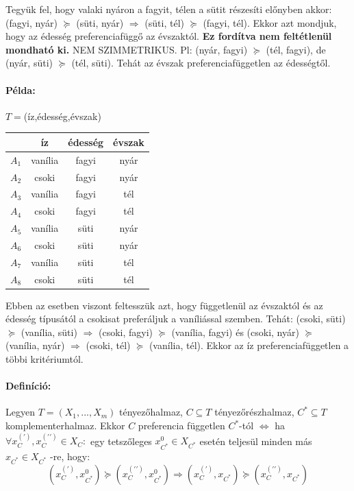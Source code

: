\documentclass[a4paper,12pt]{article}
\begin{document}
Tegyük fel, hogy valaki nyáron a fagyit, télen a sütit részesíti előnyben akkor: (fagyi, nyár) $\succeq$ (süti, nyár) 
$\Rightarrow$
(süti, tél) $\succeq$ (fagyi, tél). Ekkor azt mondjuk, hogy az édesség preferenciafüggő az évszaktól. \textbf{Ez fordítva nem feltétlenül mondható ki.} NEM SZIMMETRIKUS. Pl: (nyár, fagyi) $\succeq$ (tél, fagyi), de (nyár, süti) $\succeq$ (tél, süti). Tehát az évszak preferenciafüggetlen az édességtől.


\paragraph{Példa:}  $T=$(íz,édesség,évszak)

\begin{center}
\begin{tabular}{c||c|c|c}
 & íz& édesség& évszak \\
 \hline
 $A_1$& vanília  & fagyi & nyár \\
 $A_2$& csoki  & fagyi & nyár \\
 $A_3$& vanília  & fagyi & tél \\
 $A_4$& csoki  & fagyi & tél \\
 $A_5$& vanília  & süti & nyár \\
 $A_6$& csoki  & süti & nyár \\
 $A_7$& vanília  & süti & tél \\
 $A_8$& csoki  & süti & tél \\
\end{tabular}
\end{center}

Ebben az esetben viszont feltesszük azt, hogy függetlenül az évszaktól és az édesség típusától a csokisat preferáljuk a vaníliással szemben. Tehát: (csoki, süti) $\succeq$ (vanília, süti) $\Rightarrow$ (csoki, fagyi) $\succeq$ (vanília, fagyi) és (csoki, nyár) $\succeq$ (vanília, nyár) $\Rightarrow$ (csoki, tél) $\succeq$ (vanília, tél). Ekkor az íz preferenciafüggetlen a többi kritériumtól. 


\paragraph{Definíció: } Legyen $T=(X_1,...,X_m)$ tényezőhalmaz, $C \subseteq T$ tényezőrészhalmaz,  $C^* \subseteq T $ komplementerhalmaz. Ekkor $C$ preferencia független $C^*$-tól $\Leftrightarrow$ ha $\forall x_C^{(\prime)}, x_C^{(\prime\prime)} \in X_C:$  egy tetszőleges $x_{C^{*}}^0 \in X_{C^*}$  esetén teljesül minden más $ x_{C^{*}} \in X_{C^*}$ -re, hogy:
\begin{equation}
(x_C^{(\prime)}, x_{C^{*}}^0) \succeq (x_C^{(\prime\prime)}, x_{C^{*}}^0) 
\Rightarrow
(x_C^{(\prime)}, x_{C^{*}}) \succeq (x_C^{(\prime\prime)}, x_{C^{*}}) 
\end{equation}
\end{document}
